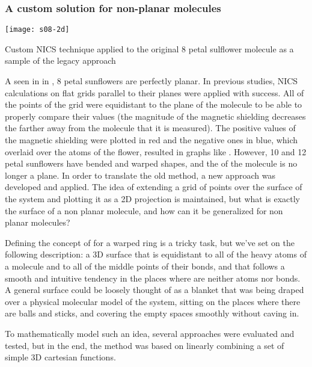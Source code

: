 \subsubsection{A custom solution for non-planar molecules}

\begin{marginfigure}
    \texttt{[image: s08-2d]}
    \caption[NICS applied to sulflower]{Custom NICS technique applied to the original 8 petal sulflower molecule as a sample of the legacy approach}
\end{marginfigure}

A seen in  in , 8 petal sunflowers are perfectly planar.
In previous studies, NICS calculations on flat grids parallel to their planes were applied with success.
All of the points of the grid were equidistant to the plane of the molecule to be able to properly compare their values (the magnitude of the magnetic shielding decreases the farther away from the molecule that it is measured).
The positive values of the magnetic shielding were plotted in red and the negative ones in blue, which overlaid over the atoms of the flower, resulted in graphs like .
However, 10 and 12 petal sunflowers have bended and warped shapes, and the  of the molecule is no longer a plane.
In order to translate the old method, a new approach was developed and applied.
The idea of extending a grid of points over the surface of the system and plotting it as a 2D projection is maintained, but what is exactly the surface of a non planar molecule, and how can it be generalized for non planar molecules?

Defining the concept of  for a warped ring is a tricky task, but we've set on the following description: a 3D surface that is equidistant to all of the heavy atoms of a molecule and to all of the middle points of their bonds, and that follows a smooth and intuitive tendency in the places where are neither atoms nor bonds. A general surface could be loosely thought of as a blanket that was being draped over a physical molecular model of the system, sitting on the places where there are balls and sticks, and covering the empty spaces smoothly without caving in.

To mathematically model such an idea, several approaches were evaluated and tested, but in the end, the method was based on linearly combining a set of simple 3D cartesian functions.

